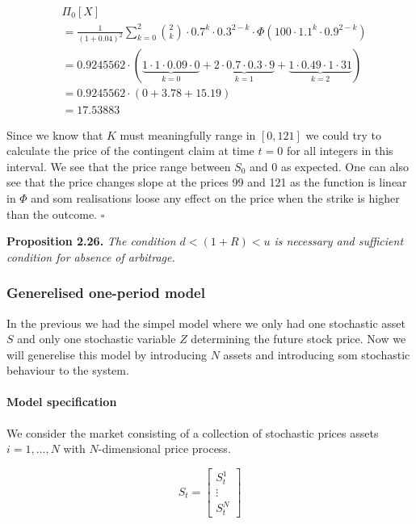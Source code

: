 \documentclass[
]{article}
\begin{document}
\begin{align*}
&\Pi_0[X]\\
&=\frac{1}{(1+0.04)^2}\sum_{k=0}^2\binom{2}{k}\cdot0.7^k\cdot0.3^{2-k}\cdot\Phi(100\cdot 1.1^k\cdot0.9^{2-k})\\
&=0.9245562\cdot\left(\underbrace{1\cdot 1\cdot0.09\cdot0}_{k=0}+\underbrace{2\cdot 0.7\cdot0.
3\cdot 9}_{k=1}+\underbrace{1\cdot 0.49\cdot1\cdot31}_{k=2}\right)\\
&=0.9245562\cdot\left(0+3.78+15.19\right)\\
&=17.53883
\end{align*}

Since we know that \(K\) must meaningfully range in \([0,121]\) we could
try to calculate the price of the contingent claim at time \(t=0\) for
all integers in this interval. We see that the price range between
\(S_0\) and 0 as expected. One can also see that the price changes slope
at the prices 99 and 121 as the function is linear in \(\Phi\) and som
realisations loose any effect on the price when the strike is higher
than the outcome. \(\square\)

\textbf{Proposition 2.26.} \emph{The condition \(d<(1+R)<u\) is
necessary and sufficient condition for absence of arbitrage.}

\hypertarget{generelised-one-period-model}{%
\subsubsection{Generelised one-period
model}\label{generelised-one-period-model}}

In the previous we had the simpel model where we only had one stochastic
asset \(S\) and only one stochastic variable \(Z\) determining the
future stock price. Now we will generelise this model by introducing
\(N\) assets and introducing som stochastic behaviour to the system.

\hypertarget{model-specification}{%
\paragraph{Model specification}\label{model-specification}}

We consider the market consisting of a collection of stochastic prices
assets \(i=1,...,N\) with \(N\)-dimensional price process.

\[
S_t=\begin{bmatrix} S_t^1\\
\vdots\\
S_t^N\end{bmatrix}
\]
\end{document}
